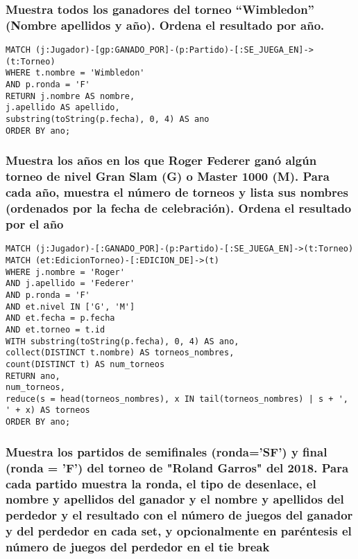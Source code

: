 \subsubsection{Muestra todos los ganadores del torneo ``Wimbledon'' (Nombre apellidos y año). Ordena el resultado por año.}

\begin{lstlisting}[language=Cypher]
MATCH (j:Jugador)-[gp:GANADO_POR]-(p:Partido)-[:SE_JUEGA_EN]->(t:Torneo)
WHERE t.nombre = 'Wimbledon'
AND p.ronda = 'F'
RETURN j.nombre AS nombre,
j.apellido AS apellido,
substring(toString(p.fecha), 0, 4) AS ano
ORDER BY ano;
\end{lstlisting}





\subsubsection{Muestra los años en los que Roger Federer ganó algún torneo de nivel Gran Slam (G) o Master 1000 (M). Para cada año, muestra el número de torneos y lista sus nombres (ordenados por la fecha de celebración). Ordena el resultado por el año}

\begin{lstlisting}[language=Cypher]
MATCH (j:Jugador)-[:GANADO_POR]-(p:Partido)-[:SE_JUEGA_EN]->(t:Torneo)
MATCH (et:EdicionTorneo)-[:EDICION_DE]->(t)
WHERE j.nombre = 'Roger'
AND j.apellido = 'Federer'
AND p.ronda = 'F'
AND et.nivel IN ['G', 'M']
AND et.fecha = p.fecha
AND et.torneo = t.id
WITH substring(toString(p.fecha), 0, 4) AS ano,
collect(DISTINCT t.nombre) AS torneos_nombres,
count(DISTINCT t) AS num_torneos
RETURN ano,
num_torneos,
reduce(s = head(torneos_nombres), x IN tail(torneos_nombres) | s + ', ' + x) AS torneos
ORDER BY ano;
\end{lstlisting}





\subsubsection{Muestra los partidos de semiﬁnales (ronda='SF') y ﬁnal (ronda = 'F') del torneo de "Roland Garros" del 2018. Para cada partido muestra la ronda, el tipo de desenlace, el nombre y apellidos del ganador y el nombre y apellidos del perdedor y el resultado con el número de juegos del ganador y del perdedor en cada set, y opcionalmente en paréntesis el número de juegos del perdedor en el tie break}

